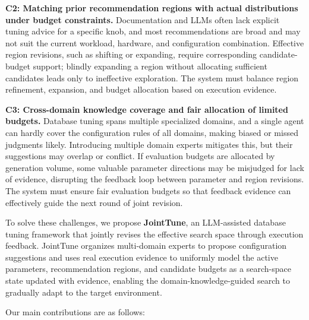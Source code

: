 \documentclass[runningheads]{llncs}
\begin{document}
\textbf{C2: Matching prior recommendation regions with actual
distributions under budget constraints.} Documentation and LLMs often
lack explicit tuning advice for a specific knob, and most recommendations
are broad and may not suit the current workload, hardware, and
configuration combination. Effective region revisions, such as shifting
or expanding, require corresponding candidate-budget support; blindly
expanding a region without allocating sufficient candidates leads only to
ineffective exploration. The system must balance region refinement,
expansion, and budget allocation based on execution evidence.

\textbf{C3: Cross-domain knowledge coverage and fair allocation of
limited budgets.} Database tuning spans multiple specialized domains, and
a single agent can hardly cover the configuration rules of all domains,
making biased or missed judgments likely. Introducing multiple domain
experts mitigates this, but their suggestions may overlap or conflict. If
evaluation budgets are allocated by generation volume, some valuable
parameter directions may be misjudged for lack of evidence, disrupting
the feedback loop between parameter and region revisions. The system must
ensure fair evaluation budgets so that feedback evidence can effectively
guide the next round of joint revision.

To solve these challenges, we propose \textbf{JointTune}, an LLM-assisted
database tuning framework that jointly revises the effective search space
through execution feedback. JointTune organizes multi-domain experts to
propose configuration suggestions and uses real execution evidence to
uniformly model the active parameters, recommendation regions, and
candidate budgets as a search-space state updated with evidence, enabling
the domain-knowledge-guided search to gradually adapt to the target
environment.

Our main contributions are as follows:
\end{document}
